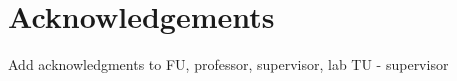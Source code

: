 \chapter*{Acknowledgements}

Add acknowledgments to FU, professor, supervisor, lab 
TU - supervisor
